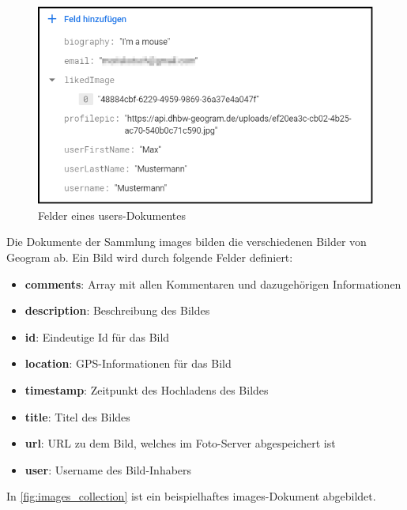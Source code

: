 \begin{figure}[H]
    \centering
    \includegraphics[width=.7\linewidth]{images/collection_users.png}
    \caption{Felder eines \glqq users\grqq{}-Dokumentes}
    \label{fig:users_collection}
\end{figure}

Die Dokumente der Sammlung \glqq images\grqq{} bilden die verschiedenen Bilder von Geogram ab. Ein Bild wird durch folgende Felder definiert:

\begin{itemize}
    \item \textbf{comments}: Array mit allen Kommentaren und dazugehörigen Informationen
    \item \textbf{description}: Beschreibung des Bildes
    \item \textbf{id}: Eindeutige Id für das Bild
    \item \textbf{location}: GPS-Informationen für das Bild
    \item \textbf{timestamp}: Zeitpunkt des Hochladens des Bildes
    \item \textbf{title}: Titel des Bildes
    \item \textbf{url}: URL zu dem Bild, welches im Foto-Server abgespeichert ist
    \item \textbf{user}: Username des Bild-Inhabers
\end{itemize}

In \autoref{fig:images_collection} ist ein beispielhaftes images-Dokument abgebildet.

